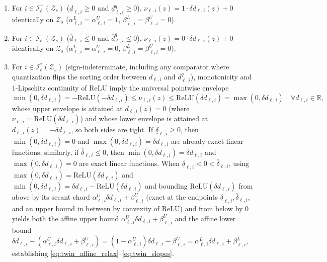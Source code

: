 \begin{enumerate}
    \item For \(i \in \mathcal{I}_\ell^+(\mathcal{Z}_s)\) (\(\underline{d}_{\ell,i} \ge 0\) and \(\underline{d}_{\ell,i}^q \ge 0\)), \(\nu_{\ell,i}(z) = 1 \cdot \delta d_{\ell,i}(z) + 0\) identically on \(\mathcal{Z}_s\) (\(\alpha_{\ell,i}^L = \alpha_{\ell,i}^U = 1\), \(\beta_{\ell,i}^L = \beta_{\ell,i}^U = 0\)).
    \item For \(i \in \mathcal{I}_\ell^-(\mathcal{Z}_s)\) (\(\overline{d}_{\ell,i} \le 0\) and \(\overline{d}_{\ell,i}^q \le 0\)), \(\nu_{\ell,i}(z) = 0 \cdot \delta d_{\ell,i}(z) + 0\) identically on \(\mathcal{Z}_s\) (\(\alpha_{\ell,i}^L = \alpha_{\ell,i}^U = 0\), \(\beta_{\ell,i}^L = \beta_{\ell,i}^U = 0\)).
    \item For \(i \in \mathcal{I}_\ell^*(\mathcal{Z}_s)\) (sign-indeterminate, including any comparator where quantization flips the sorting order between \(d_{\ell,i}\) and \(d_{\ell,i}^q\)), monotonicity and \(1\)-Lipschitz continuity of \(\mathrm{ReLU}\) imply the universal pointwise envelope
    \[
    \min(0, \delta d_{\ell,i}) = -\mathrm{ReLU}(-\delta d_{\ell,i}) \le \nu_{\ell,i}(z) \le \mathrm{ReLU}(\delta d_{\ell,i}) = \max(0, \delta d_{\ell,i}) \quad \forall d_{\ell,i} \in \mathbb{R},
    \]
    whose upper envelope is attained at \(d_{\ell,i}(z) = 0\) (where \(\nu_{\ell,i} = \mathrm{ReLU}(\delta d_{\ell,i})\)) and whose lower envelope is attained at \(d_{\ell,i}(z) = -\delta d_{\ell,i}\), so both sides are tight. If \(\underline{\delta}_{\ell,i} \ge 0\), then \(\min(0, \delta d_{\ell,i}) = 0\) and \(\max(0, \delta d_{\ell,i}) = \delta d_{\ell,i}\) are already exact linear functions; similarly, if \(\overline{\delta}_{\ell,i} \le 0\), then \(\min(0, \delta d_{\ell,i}) = \delta d_{\ell,i}\) and \(\max(0, \delta d_{\ell,i}) = 0\) are exact linear functions. When \(\underline{\delta}_{\ell,i} < 0 < \overline{\delta}_{\ell,i}\), using \(\max(0, \delta d_{\ell,i}) = \mathrm{ReLU}(\delta d_{\ell,i})\) and \(\min(0, \delta d_{\ell,i}) = \delta d_{\ell,i} - \mathrm{ReLU}(\delta d_{\ell,i})\) and bounding \(\mathrm{ReLU}(\delta d_{\ell,i})\) from above by its secant chord \(\alpha_{\ell,i}^U \delta d_{\ell,i} + \beta_{\ell,i}^U\) (exact at the endpoints \(\underline{\delta}_{\ell,i}, \overline{\delta}_{\ell,i}\), and an upper bound in between by convexity of \(\mathrm{ReLU}\)) and from below by \(0\) yields both the affine upper bound \(\alpha_{\ell,i}^U \delta d_{\ell,i} + \beta_{\ell,i}^U\) and the affine lower bound \(\delta d_{\ell,i} - (\alpha_{\ell,i}^U \delta d_{\ell,i} + \beta_{\ell,i}^U) = (1 - \alpha_{\ell,i}^U)\delta d_{\ell,i} - \beta_{\ell,i}^U = \alpha_{\ell,i}^L \delta d_{\ell,i} + \beta_{\ell,i}^L\), establishing \eqref{eq:twin_affine_relax}--\eqref{eq:twin_slopes}.
\end{enumerate}

